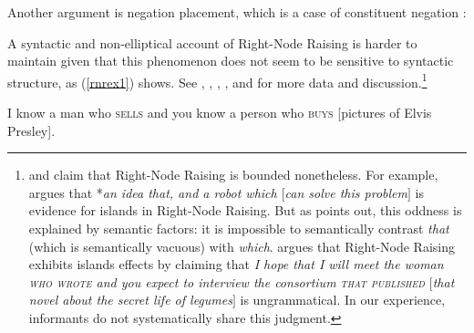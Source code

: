 {\noindent
Another argument is negation placement, which is a case of constituent negation
\citep[253]{Mouret:06}: 

\begin{exe}
 \ex 
 \begin{xlista}
\end{xlista}
\end{exe}


A syntactic and non-elliptical account of Right-Node Raising is harder to maintain given that this phenomenon does not seem to be sensitive to  syntactic structure, as (\ref{rnrex1}) shows. See 
\citet{bresnan74}, \citet[299]{wexlercull},  \citet[45]{grosu81}, \citet{mccawley}, and \citet[382, fn.\ 30]{sab}
for more data and discussion.\footnote{\citet{steedman85,gapsteed,steedmanbook}
and \citet[183]{dowty88} claim that
Right-Node Raising is bounded nonetheless.
For example, \citet{
dowty88} argues that  *\emph{an idea that, and a robot which $[$can solve this problem$]$} is  evidence for islands in Right-Node Raising. But as \citet[95]{phil}
 points out, this oddness is explained by semantic factors: it is impossible to   semantically contrast \emph{that} (which is semantically vacuous) with \emph{which}.
 \citet[17]{steedmanbook}   argues that Right-Node Raising
exhibits islands effects by claiming that \emph{I hope that I will meet the woman
\textsc{who wrote} and you expect to interview the
consortium \textsc{that published} $[$that
novel about the secret life of legumes$]$} is ungrammatical.
In our experience, informants do not systematically share this judgment.}


\begin{exe}
\ex
\begin{xlista}
\ex  I know a man who \textsc{sells} and you know a person who \textsc{buys}
                     [pictures of Elvis Presley].


\end{xlista}
\end{exe}}
